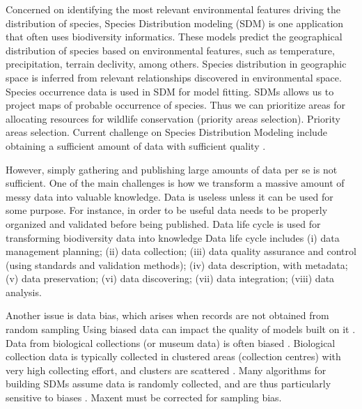 Concerned on identifying the most relevant environmental features driving the distribution of species, Species Distribution modeling (SDM) is one application that often uses biodiversity informatics.
These models predict the geographical distribution of species based on environmental features, such as temperature, precipitation, terrain declivity, among others.
Species distribution in geographic space is inferred from relevant relationships discovered in environmental space.
Species occurrence data is used in SDM for model fitting. 
SDMs allows us to project maps of probable occurrence of species.
Thus we can prioritize areas for allocating resources for wildlife conservation (priority areas selection).
Priority areas selection. %
Current challenge on Species Distribution Modeling include obtaining a sufficient amount of data with sufficient quality \cite{Araujo2006}.






However, simply gathering and publishing large amounts of data per se is not sufficient.
One of the main challenges is how we transform a massive amount of messy data into valuable knowledge.
Data is useless unless it can be used for some purpose.
For instance, in order to be useful data needs to be properly organized and validated before being published.
Data life cycle is used for transforming biodiversity data into knowledge \cite{Michener2012}
Data life cycle includes (i) data management planning; (ii) data collection; (iii) data quality assurance and control (using standards and validation methods); (iv) data description, with metadata; (v) data preservation; (vi) data discovering; (vii) data integration; (viii) data analysis. 




Another issue is data bias, which arises when records are not obtained from random sampling \cite{Daru2017}
Using biased data can impact the quality of models built on it \cite{Newbold2010}.
Data from biological collections (or museum data) is often biased \cite{Daru2017}.
Biological collection data is typically collected in clustered areas (collection centres) with very high collecting effort, and clusters are scattered \cite{Nelson1990, VanGemerden2005}.
Many algorithms for building SDMs assume data is randomly collected, and are thus particularly sensitive to biases \cite{Araujo2016} .
Maxent must be corrected for sampling bias.%


